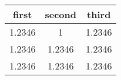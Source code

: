 \begin{table}
    \centering
    \begin{tabular}{ccc}
        \toprule
        first & second & third \\
        \midrule
        1.2346 & 1 & 1.2346 \\
        1.2346 & 1.2346 & 1.2346 \\
        1.2346 & 1.2346 & 1.2346 \\
        \bottomrule
    \end{tabular}
\end{table}
